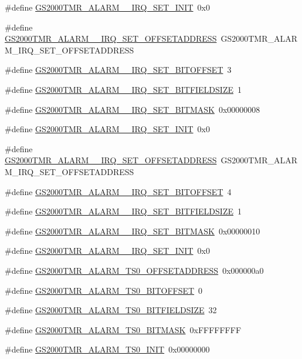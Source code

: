 \begin{DoxyCompactItemize}
\#define \hyperlink{a00556_ade9dff5a7b8913b511f1d962afa60f0a}{GS2000TMR\_\-ALARM\_\_\-IRQ\_\-SET\_\-INIT}~0x0
\item 
\#define \hyperlink{a00556_ab8374a65340f412f457b7579cec65d91}{GS2000TMR\_\-ALARM\_\_\-IRQ\_\-SET\_\-OFFSETADDRESS}~GS2000TMR\_\-ALARM\_\-IRQ\_\-SET\_\-OFFSETADDRESS
\item 
\#define \hyperlink{a00556_a5003badf5af85c2841012433d38d354e}{GS2000TMR\_\-ALARM\_\_\-IRQ\_\-SET\_\-BITOFFSET}~3
\item 
\#define \hyperlink{a00556_ad5016ee1f929f04c42e074c862cc0e71}{GS2000TMR\_\-ALARM\_\_\-IRQ\_\-SET\_\-BITFIELDSIZE}~1
\item 
\#define \hyperlink{a00556_a1290ed5c36f3772afce2bf237dc8add0}{GS2000TMR\_\-ALARM\_\_\-IRQ\_\-SET\_\-BITMASK}~0x00000008
\item 
\#define \hyperlink{a00556_a24b38053a3bd08a31b83d10e0dab951a}{GS2000TMR\_\-ALARM\_\_\-IRQ\_\-SET\_\-INIT}~0x0
\item 
\#define \hyperlink{a00556_af0ffa66db498805ab44111a56b335a7a}{GS2000TMR\_\-ALARM\_\_\-IRQ\_\-SET\_\-OFFSETADDRESS}~GS2000TMR\_\-ALARM\_\-IRQ\_\-SET\_\-OFFSETADDRESS
\item 
\#define \hyperlink{a00556_a675f9d97e78985bd921a4d543fecceb4}{GS2000TMR\_\-ALARM\_\_\-IRQ\_\-SET\_\-BITOFFSET}~4
\item 
\#define \hyperlink{a00556_acb45d2642a2fa22e2838ae8668a0e0c1}{GS2000TMR\_\-ALARM\_\_\-IRQ\_\-SET\_\-BITFIELDSIZE}~1
\item 
\#define \hyperlink{a00556_a9ae04c09ce48c2482d429e34b8fff2fb}{GS2000TMR\_\-ALARM\_\_\-IRQ\_\-SET\_\-BITMASK}~0x00000010
\item 
\#define \hyperlink{a00556_a183e9f29b537fc953feacd6ee5a65946}{GS2000TMR\_\-ALARM\_\_\-IRQ\_\-SET\_\-INIT}~0x0
\item 
\#define \hyperlink{a00556_a395121c662763fb22bf11b502eb2dcdc}{GS2000TMR\_\-ALARM\_\-TS0\_\-OFFSETADDRESS}~0x000000a0
\item 
\#define \hyperlink{a00556_adb2e0b3b397ab638dc0dfff1400a918a}{GS2000TMR\_\-ALARM\_\-TS0\_\-BITOFFSET}~0
\item 
\#define \hyperlink{a00556_a3b05665dfd50ca0fecabd5ba0c660672}{GS2000TMR\_\-ALARM\_\-TS0\_\-BITFIELDSIZE}~32
\item 
\#define \hyperlink{a00556_ac54184f81134710aeb8dad95457ed741}{GS2000TMR\_\-ALARM\_\-TS0\_\-BITMASK}~0xFFFFFFFF
\item 
\#define \hyperlink{a00556_a3b8d5aaf0174363d540bc3a194ff36ff}{GS2000TMR\_\-ALARM\_\-TS0\_\-INIT}~0x00000000

\end{DoxyCompactItemize}
